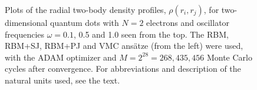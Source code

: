\begin{landscape}
\begin{figure}
		\hspace{0.1cm}
		
		\caption{Plots of the radial two-body density profiles, $\rho(r_i, r_j)$, for two-dimensional quantum dots with $N=2$ electrons and oscillator frequencies $\omega=0.1$, 0.5 and 1.0 seen from the top. The RBM, RBM+SJ, RBM+PJ and VMC ansätze (from the left) were used, with the ADAM optimizer and $M=2^{28}=268,435,456$ Monte Carlo cycles after convergence. For  abbreviations and description of the natural units used, see the text.}%
		\label{fig:TB_interaction_2P}
	\end{figure}
\end{landscape}
